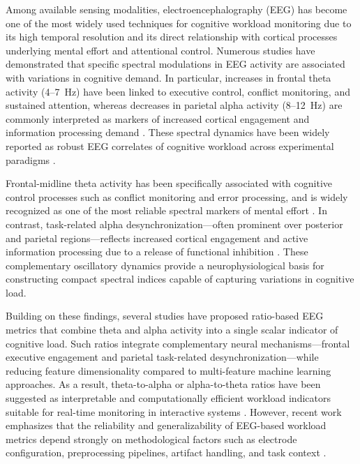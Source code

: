 \documentclass[10pt]{iopart}
\begin{document}
Among available sensing modalities, electroencephalography (EEG)
has become one of the most widely used techniques for cognitive
workload monitoring due to its high temporal resolution and its
direct relationship with cortical processes underlying mental
effort and attentional control. Numerous studies have demonstrated
that specific spectral modulations in EEG activity are associated
with variations in cognitive demand. In particular, increases in
frontal theta activity (4--7~Hz) have been linked to executive
control, conflict monitoring, and sustained attention, whereas
decreases in parietal alpha activity (8--12~Hz) are commonly
interpreted as markers of increased cortical engagement and
information processing demand \cite{c8}. These spectral dynamics
have been widely reported as robust EEG correlates of cognitive
workload across experimental paradigms \cite{c1,c4}.

Frontal-midline theta activity has been specifically associated
with cognitive control processes such as conflict monitoring and
error processing, and is widely recognized as one of the most
reliable spectral markers of mental effort
\cite{CavanaghFrank2014_FrontalTheta}. In contrast, task-related
alpha desynchronization---often prominent over posterior and
parietal regions---reflects increased cortical engagement and
active information processing due to a release of functional
inhibition \cite{Klimesch2007_AlphaInhibitionTiming}. These
complementary oscillatory dynamics provide a neurophysiological
basis for constructing compact spectral indices capable of
capturing variations in cognitive load.

Building on these findings, several studies have proposed
ratio-based EEG metrics that combine theta and alpha activity into
a single scalar indicator of cognitive load. Such ratios integrate
complementary neural mechanisms---frontal executive engagement and
parietal task-related desynchronization---while reducing feature
dimensionality compared to multi-feature machine learning
approaches. As a result, theta-to-alpha or alpha-to-theta ratios
have been suggested as interpretable and computationally efficient
workload indicators suitable for real-time monitoring in
interactive systems \cite{c1,c7}. However, recent work emphasizes
that the reliability and generalizability of EEG-based workload
metrics depend strongly on methodological factors such as electrode
configuration, preprocessing pipelines, artifact handling, and
task context \cite{c4,c6,Mastropietro2023_ReliabilityFzPz}.
\end{document}
